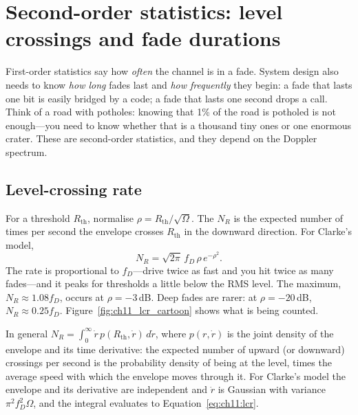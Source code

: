 \section{Second-order statistics: level crossings and fade durations}
\label{sec:ch11:clarke}

First-order statistics say how \emph{often} the channel is in a fade. System design also needs to
know \emph{how long} fades last and \emph{how frequently} they begin: a fade that lasts one bit is
easily bridged by a code; a fade that lasts one second drops a call. Think of a road with
potholes: knowing that 1\% of the road is potholed is not enough---you need to know whether that is
a thousand tiny ones or one enormous crater. These are second-order statistics, and they depend
on the Doppler spectrum.


\subsection{Level-crossing rate}

For a threshold $R_{\text{th}}$, normalise $\rho=R_{\text{th}}/\sqrt\Omega$. The
 $N_R$ is the expected number of times per second the envelope crosses
$R_{\text{th}}$ in the downward direction. For Clarke's model,
\begin{equation}
N_R=\sqrt{2\pi}\,f_D\,\rho\,e^{-\rho^2}.
\label{eq:ch11:lcr}
\end{equation}
The rate is proportional to $f_D$---drive twice as fast and you hit twice as many fades---and it
peaks for thresholds a little below the RMS level. The maximum, $N_R\approx1.08f_D$, occurs at
$\rho=-3$\,dB. Deep fades are rarer: at $\rho=-20$\,dB, $N_R\approx0.25f_D$.
Figure~\ref{fig:ch11_lcr_cartoon} shows what is being counted.



\begin{deeper}
In general $N_R=\int_0^\infty\dot r\,p(R_{\text{th}},\dot r)\,d\dot r$, where $p(r,\dot r)$ is the
joint density of the envelope and its time derivative: the expected number of upward (or downward)
crossings per second is the probability density of being at the level, times the average speed
with which the envelope moves through it. For Clarke's model the envelope and its derivative are
independent and $\dot r$ is Gaussian with variance $\pi^2f_D^2\Omega$, and the integral evaluates to
Equation~\eqref{eq:ch11:lcr}.
\end{deeper}

